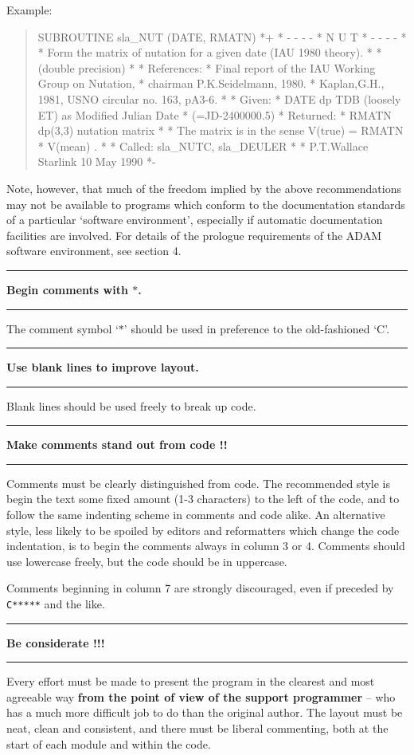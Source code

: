 \documentclass[twoside,11pt,nolof,noabs]{starlink}
\newcounter{sruleno}
\providecommand{\srule}[1]{
    \addtocounter{sruleno}{1}
    \goodbreak
    \rule{\textwidth}{0.3mm}
    \textbf{#1} \scpushright{ \textbf{\thesruleno}}
    \rule{\textwidth}{0.1mm}
}
\renewcommand{\_}{{\tt\char'137}}
\begin{document}
\goodbreak
Example:
\begin{quote}
\begin{footnotesize}
\begin{terminalv}
      SUBROUTINE sla_NUT (DATE, RMATN)
*+
*     - - - -
*      N U T
*     - - - -
*
*  Form the matrix of nutation for a given date (IAU 1980 theory).
*
*  (double precision)
*
*  References:
*     Final report of the IAU Working Group on Nutation,
*                                 chairman P.K.Seidelmann, 1980.
*     Kaplan,G.H., 1981, USNO circular no. 163, pA3-6.
*
*  Given:
*     DATE   dp         TDB (loosely ET) as Modified Julian Date
*                                           (=JD-2400000.5)
*  Returned:
*     RMATN  dp(3,3)    nutation matrix
*
*  The matrix is in the sense   V(true)  =  RMATN * V(mean) .
*
*  Called:   sla_NUTC, sla_DEULER
*
*  P.T.Wallace   Starlink   10 May 1990
*-
\end{terminalv}
\end{footnotesize}
\end{quote}
Note, however, that much of the freedom implied by the above recommendations
may not be available to programs which conform to the documentation standards of
a particular `software environment', especially if automatic documentation
facilities are involved.
For details of the prologue requirements of the ADAM software environment, see
section 4.

\srule{Begin comments with $\ast$.}
The comment symbol `$\ast$' should be used in
preference to the old-fashioned `C'.

\srule{Use blank lines to improve layout.}
Blank lines should be used freely to break up code.

\srule{Make comments stand out from code !!}
Comments must be clearly distinguished from code.  The recommended
style is begin the text some fixed amount (1-3 characters) to the
left of the code, and to follow the same indenting scheme in
comments and code alike.  An alternative style, less likely
to be spoiled by editors and reformatters which change
the code indentation, is to begin the comments always in column
3 or 4.  Comments should use lowercase freely, but the code should
be in uppercase.

Comments beginning in column 7 are strongly discouraged, even if preceded by
\mbox{\tt{C*****}} and the like.
\srule{Be considerate !!!}
Every effort must be made to present the program in the clearest and most
agreeable way \textbf{from the point
of view of the support programmer} -- who has a much
more difficult job to do than the original author.
The layout must be neat, clean and consistent, and there must
be liberal commenting, both at the start of each module and
within the code.
\end{document}
